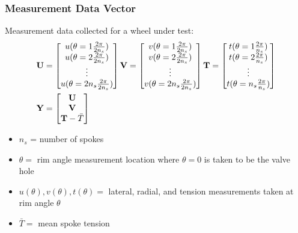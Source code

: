 \documentclass[mathserif]{beamer}
\begin{document}
\begin{frame}
\frametitle{Measurement Data Vector}
Measurement data collected for a wheel under test:
\begin{align*}
    \bf U &=  \begin{bmatrix}
        u(\theta = 1\frac{2\pi}{2n_s})\\
        u(\theta = 2\frac{2\pi}{2n_s})\\
        \vdots\\
        u(\theta = 2n_s\frac{2\pi}{2n_s})
        \end{bmatrix}
    \bf V = \begin{bmatrix}
        v(\theta = 1\frac{2\pi}{2n_s})\\
        v(\theta = 2\frac{2\pi}{2n_s})\\
        \vdots\\
        v(\theta = 2n_s\frac{2\pi}{2n_s})
    \end{bmatrix}
        \bf T = \begin{bmatrix}
        t(\theta = 1\frac{2\pi}{n_s})\\
        t(\theta = 2\frac{2\pi}{n_s})\\
        \vdots\\
        t(\theta = n_s\frac{2\pi}{n_s})
    \end{bmatrix} \\
    \bf Y &= \begin{bmatrix}
    \bf U\\\bf V\\ \mathbf {T}-\bar T
    \end{bmatrix}
\end{align*}

\begin{itemize}
    \item $n_s$ = number of spokes
    \item $\theta=$ rim angle measurement location where $\theta = 0$ is taken to be the valve hole
    \item $u(\theta),v(\theta),t(\theta)=$ lateral, radial, and tension measurements taken at rim angle $\theta$
    \item $\bar T=$ mean spoke tension
\end{itemize}
\end{frame}
\end{document}
